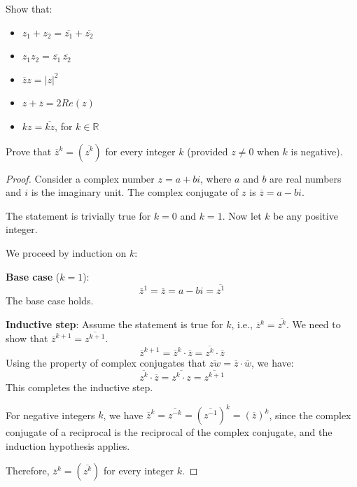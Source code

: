 \documentclass[
	12pt, %
	fleqn, %
	a4paper, %
]{LegrandOrangeBook}
\begin{document}
        \begin{exercise}
            Show that:
            \begin{itemize}
                \item $z_1 + z_2 = \overline{z_1} + \overline{z_2}$
                \item $z_1z_2 = \overline{z_1} \, \overline{z_2}$
                \item $\overline{z}z = \lvert z \rvert^2$
                \item $z + \overline{z} = 2Re(z)$
                \item $kz = \overline{kz}$, for $k \in \mathbb{R}$
              \end{itemize}
        \end{exercise}
        \begin{exercise}
            Prove that \( \overline{z}^k = (\overline{z^k}) \) for every integer \( k \) (provided \( z \neq 0 \) when \( k \) is negative).
            \end{exercise}
            
            \begin{proof}
            Consider a complex number \( z = a + bi \), where \( a \) and \( b \) are real numbers and \( i \) is the imaginary unit. The complex conjugate of \( z \) is \( \overline{z} = a - bi \).
            
            The statement is trivially true for \( k = 0 \) and \( k = 1 \). Now let \( k \) be any positive integer.
            
            We proceed by induction on \( k \):
            
            \textbf{Base case} (\( k = 1 \)):
            \[ \overline{z}^1 = \overline{z} = a - bi = \overline{z^1} \]
            The base case holds.
            
            \textbf{Inductive step}:
            Assume the statement is true for \( k \), i.e., \( \overline{z}^k = \overline{z^k} \). We need to show that \( \overline{z}^{k+1} = \overline{z^{k+1}} \).
            \[ \overline{z}^{k+1} = \overline{z}^k \cdot \overline{z} = \overline{z^k} \cdot \overline{z} \]
            Using the property of complex conjugates that \( \overline{zw} = \overline{z} \cdot \overline{w} \), we have:
            \[ \overline{z^k} \cdot \overline{z} = \overline{z^k \cdot z} = \overline{z^{k+1}} \]
            This completes the inductive step.
            
            For negative integers \( k \), we have \( \overline{z}^k = \overline{z^{-k}} = (\overline{z^{-1}})^k = (\overline{z})^k \), since the complex conjugate of a reciprocal is the reciprocal of the complex conjugate, and the induction hypothesis applies.
            
            Therefore, \( \overline{z}^k = (\overline{z^k}) \) for every integer \( k \).
            \end{proof}
\end{document}
